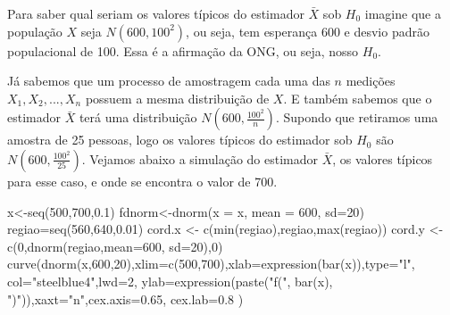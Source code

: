 \documentclass[
  letterpaper,
  DIV=11,
  numbers=noendperiod]{scrartcl}
\newenvironment{Shaded}{\begin{snugshade}}{\end{snugshade}}
\newcommand{\AttributeTok}[1]{\textcolor[rgb]{0.40,0.45,0.13}{#1}}
\newcommand{\DecValTok}[1]{\textcolor[rgb]{0.68,0.00,0.00}{#1}}
\newcommand{\FloatTok}[1]{\textcolor[rgb]{0.68,0.00,0.00}{#1}}
\newcommand{\FunctionTok}[1]{\textcolor[rgb]{0.28,0.35,0.67}{#1}}
\newcommand{\NormalTok}[1]{\textcolor[rgb]{0.00,0.23,0.31}{#1}}
\newcommand{\OtherTok}[1]{\textcolor[rgb]{0.00,0.23,0.31}{#1}}
\newcommand{\StringTok}[1]{\textcolor[rgb]{0.13,0.47,0.30}{#1}}
\begin{document}
Para saber qual seriam os valores típicos do estimador \(\bar{X}\) sob
\(H_0\) imagine que a população \(X\) seja \(N(600,100^2)\), ou seja,
tem esperança 600 e desvio padrão populacional de 100. Essa é a
afirmação da ONG, ou seja, nosso \(H_0\).

Já sabemos que um processo de amostragem cada uma das \(n\) medições
\(X_1, X_2, ...,X_n\) possuem a mesma distribuição de \(X\). E também
sabemos que o estimador \(\bar{X}\) terá uma distribuição
\(N(600,\frac{100^2}{n})\). Supondo que retiramos uma amostra de 25
pessoas, logo os valores típicos do estimador sob \(H_0\) são
\(N(600,\frac{100^2}{25})\). Vejamos abaixo a simulação do estimador
\(\bar{X}\), os valores típicos para esse caso, e onde se encontra o
valor de 700.

\begin{Shaded}
\begin{Highlighting}[]
\NormalTok{x}\OtherTok{\textless{}{-}}\FunctionTok{seq}\NormalTok{(}\DecValTok{500}\NormalTok{,}\DecValTok{700}\NormalTok{,}\FloatTok{0.1}\NormalTok{) }
\NormalTok{fdnorm}\OtherTok{\textless{}{-}}\FunctionTok{dnorm}\NormalTok{(}\AttributeTok{x =}\NormalTok{ x, }\AttributeTok{mean =} \DecValTok{600}\NormalTok{, }\AttributeTok{sd=}\DecValTok{20}\NormalTok{)   }
\NormalTok{regiao}\OtherTok{=}\FunctionTok{seq}\NormalTok{(}\DecValTok{560}\NormalTok{,}\DecValTok{640}\NormalTok{,}\FloatTok{0.01}\NormalTok{)}
\NormalTok{cord.x }\OtherTok{\textless{}{-}} \FunctionTok{c}\NormalTok{(}\FunctionTok{min}\NormalTok{(regiao),regiao,}\FunctionTok{max}\NormalTok{(regiao))}
\NormalTok{cord.y }\OtherTok{\textless{}{-}} \FunctionTok{c}\NormalTok{(}\DecValTok{0}\NormalTok{,}\FunctionTok{dnorm}\NormalTok{(regiao,}\AttributeTok{mean=}\DecValTok{600}\NormalTok{, }\AttributeTok{sd=}\DecValTok{20}\NormalTok{),}\DecValTok{0}\NormalTok{) }
\FunctionTok{curve}\NormalTok{(}\FunctionTok{dnorm}\NormalTok{(x,}\DecValTok{600}\NormalTok{,}\DecValTok{20}\NormalTok{),}\AttributeTok{xlim=}\FunctionTok{c}\NormalTok{(}\DecValTok{500}\NormalTok{,}\DecValTok{700}\NormalTok{),}\AttributeTok{xlab=}\FunctionTok{expression}\NormalTok{(}\FunctionTok{bar}\NormalTok{(x)),}\AttributeTok{type=}\StringTok{"l"}\NormalTok{,}
      \AttributeTok{col=}\StringTok{"steelblue4"}\NormalTok{,}\AttributeTok{lwd=}\DecValTok{2}\NormalTok{, }\AttributeTok{ylab=}\FunctionTok{expression}\NormalTok{(}\FunctionTok{paste}\NormalTok{(}\StringTok{"f("}\NormalTok{, }\FunctionTok{bar}\NormalTok{(x),}
      \StringTok{")"}\NormalTok{)),}\AttributeTok{xaxt=}\StringTok{"n"}\NormalTok{,}\AttributeTok{cex.axis=}\FloatTok{0.65}\NormalTok{, }\AttributeTok{cex.lab=}\FloatTok{0.8}\NormalTok{ ) }

\end{Highlighting}
\end{Shaded}
\end{document}
